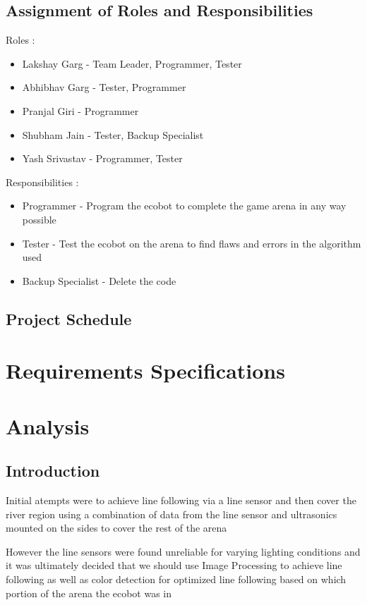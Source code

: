 \documentclass[12pt,a4paper]{article}
\begin{document}
    \subsection{Assignment of Roles and Responsibilities}
      Roles :\\
      \begin{itemize}
        \item Lakshay Garg - Team Leader, Programmer, Tester
        \item Abhibhav Garg - Tester, Programmer
        \item Pranjal Giri - Programmer
        \item Shubham Jain - Tester, Backup Specialist
        \item Yash Srivastav - Programmer, Tester
      \end{itemize}
      Responsibilities :\\
      \begin{itemize}
        \item Programmer - Program the ecobot to complete the game arena in any way possible
        \item Tester - Test the ecobot on the arena to find flaws and errors in the algorithm used
        \item Backup Specialist - Delete the code
      \end{itemize}
    \clearpage
    \subsection{Project Schedule}
      \lipsum[1]
    \clearpage

  \section{Requirements Specifications}
    \subsection{}
      \lipsum[15-20]
    \clearpage

  \section{Analysis}
    \subsection{Introduction}
      Initial atempts were to achieve line following via a line sensor  
      and then cover the river region using a combination of data from  
      the line sensor and ultrasonics mounted on the sides to cover  
      the rest of the arena \par
      However the line sensors were found unreliable for varying lighting  
      conditions and it was ultimately decided that we should use Image  
      Processing to achieve line following as well as color detection for  
      optimized line following based on which portion of the arena the ecobot was in
    \clearpage
\end{document}
